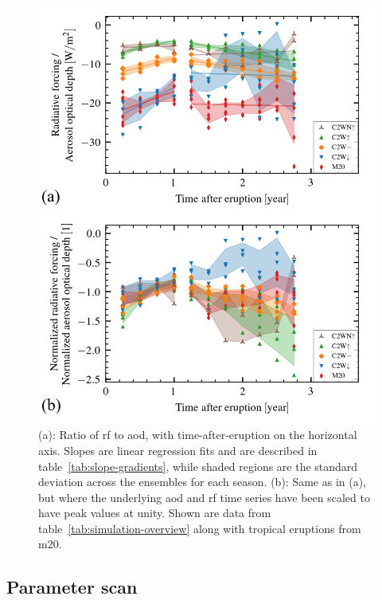 \documentclass{ametsocV6.1}
\begin{document}
\begin{figure}
  \centering
  \includegraphics{figures/figure3.png}

  \caption{(a): Ratio of \gls{rf} to \gls{aod}, with time-after-eruption on the horizontal
    axis. Slopes are linear regression fits and are described in
    table~\ref{tab:slope-gradients}, while shaded regions are the standard deviation across
    the ensembles for each season. (b): Same as in (a), but where the underlying \gls{aod}
    and \gls{rf} time series have been scaled to have peak values at unity. Shown are data
    from table~\ref{tab:simulation-overview} along with tropical eruptions from
    \gls{m20}.}\label{fig:aod_vs_toa_avg_loop_ratios}%
\end{figure}

\subsection{Parameter scan}
\end{document}
